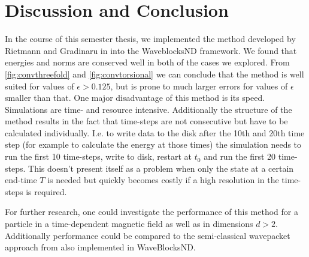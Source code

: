 \documentclass[11pt, a4paper, oneside]{article}
\begin{document}
\section{Discussion and Conclusion}
In the course of this semester thesis, we implemented the method developed by Rietmann and Gradinaru in  into the WaveblocksND framework. We found that energies and norms are conserved well in both of the cases we explored.
From \cref{fig:convthreefold} and \cref{fig:convtorsional} we can conclude that the method is well suited for values of $\epsilon > 0.125$, but is prone to much larger errors for values of $\epsilon$ smaller than that.\newline
One major disadvantage of this method is its speed. Simulations are time- and resource intensive. Additionally the structure of the method results in the fact that time-steps are not consecutive but have to be calculated individually. I.e. to write data to the disk after the 10th and 20th time step (for example to calculate the energy at those times) the simulation needs to run the first 10 time-steps, write to disk, restart at $t_0$ and run the first 20 time-steps. This doesn't present itself as a problem when only the state at a certain end-time $T$ is needed but quickly becomes costly if a high resolution in the time-steps is required.

For further research, one could investigate the performance of this method for a particle in a time-dependent magnetic field as well as in dimensions $d > 2$. Additionally performance could be compared to the semi-classical wavepacket approach from  also implemented in WaveBlocksND.
\end{document}
